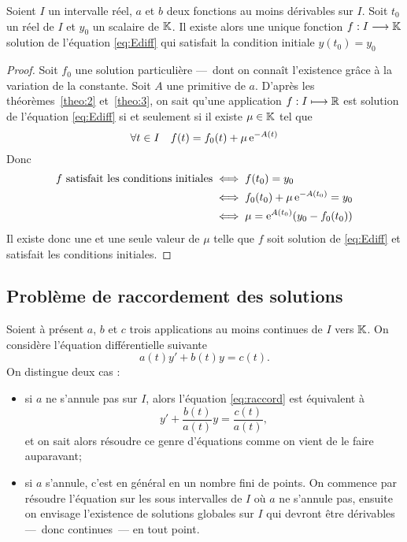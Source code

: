 %
\begin{theo} 
  \label{theo:4}
  Soient \(I\) un intervalle réel, \(a\) et \(b\) deux fonctions au moins dérivables sur \(I\). Soit \(t_0\) un réel de \(I\) et \(y_0\) un scalaire de \(\mathbb{K}\). Il existe alors une unique fonction \(f:I \longrightarrow \mathbb{K}\) solution de l'équation \eqref{eq:Ediff} qui satisfait la condition initiale \(y(t_0)=y_0\)
\end{theo}
\begin{proof}
  Soit \(f_0\) une solution particulière ---~dont on connaît l'existence grâce à la variation de la constante. Soit \(A\) une primitive de \(a\). D'après les théorèmes~\ref{theo:2} et~\ref{theo:3}, on sait qu'une application \(f:I \longmapsto \mathbb{R}\) est solution de l'équation \eqref{eq:Ediff} si et seulement si il existe \(\mu \in \mathbb{K}\) tel que
  \begin{equation}
    \forall t \in I \quad f(t)=f_0(t) + \mu \operatorname{e}^{-A(t)}
  \end{equation}
Donc 
\begin{align}
  f \text{~satisfait les conditions initiales} & \iff f(t_0)=y_0 \\ & \iff f_0(t_0)+\mu\operatorname{e}^{-A(t_0)} = y_0 \\ & \iff \mu = \operatorname{e}^{A(t_0)}(y_0-f_0(t_0))
\end{align}
Il existe donc une et une seule valeur de \(\mu\) telle que \(f\) soit solution de \eqref{eq:Ediff} et satisfait les conditions initiales.
\end{proof}

\subsection{Problème de raccordement des solutions}
\label{subsec:pbmraccordement}
Soient à présent \(a\), \(b\) et \(c\) trois applications au moins continues de \(I\) vers \(\mathbb{K}\). On considère l'équation différentielle suivante
\begin{equation}
  \label{eq:raccord}
  a(t) y'+b(t)y=c(t).
\end{equation}
On distingue deux cas :
\begin{itemize}
\item si \(a\) ne s'annule pas sur \(I\), alors l'équation \eqref{eq:raccord} est équivalent à
  \begin{equation}
      y' + \frac{b(t)}{a(t)} y = \frac{c(t)}{a(t)},
  \end{equation}
et on sait alors résoudre ce genre d'équations comme on vient de le faire auparavant;
\item si \(a\) s'annule, c'est en général en un nombre fini de points. On commence par résoudre l'équation sur les sous intervalles de \(I\) où \(a\) ne s'annule pas, ensuite on envisage l'existence de solutions globales sur \(I\) qui devront être dérivables ---~donc continues~--- en tout point.
\end{itemize}
%
